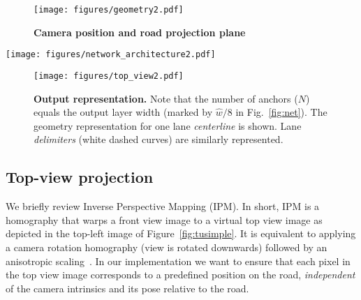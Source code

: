 \documentclass[10pt,twocolumn,letterpaper]{article}
\begin{document}
\begin{figure}[t]
	\begin{center}
		\texttt{[image: figures/geometry2.pdf]}
	\end{center}
	\caption{\textbf{Camera position and road projection plane}}
	\label{fig:geometry}
	
\end{figure}


\begin{figure*}[t]
	\begin{center}
		\texttt{[image: figures/network\_architecture2.pdf]} 
	\end{center}
	\caption{\textbf{3D-LaneNet network architecture.}}
	\label{fig:net}
\end{figure*}

\begin{figure}[t]
	\begin{center}
		\texttt{[image: figures/top\_view2.pdf]}
	\end{center}
	\caption{\textbf{Output representation.} Note that the number of anchors ($N$) equals the output layer width (marked by $\hat{w}/8$ in Fig.~\ref{fig:net}). The geometry representation for one lane \textit{centerline} is shown. Lane \textit{delimiters} (white dashed curves) are similarly represented.}
	\label{fig:out}
\end{figure}

\subsection{Top-view projection}\label{sec:IPM}
We briefly review Inverse Perspective Mapping (IPM). In short, IPM is a homography that warps a front view image to a virtual top view image as depicted in the top-left image of Figure~\ref{fig:tusimple}. It is equivalent to applying a camera rotation homography (view is rotated downwards) followed by an anisotropic scaling~\cite{Hartley2004}. In our implementation we want to ensure that each pixel in the top view image corresponds to a predefined position on the road, \textit{independent} of the camera intrinsics and its pose relative to the road.
\end{document}
